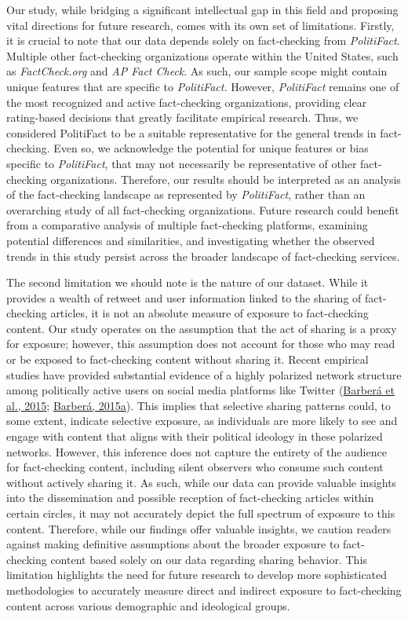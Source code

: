 \documentclass[
  12pt,
]{article}
\begin{document}
Our study, while bridging a significant intellectual gap in this field
and proposing vital directions for future research, comes with its own
set of limitations. Firstly, it is crucial to note that our data depends
solely on fact-checking from \emph{PolitiFact}. Multiple other
fact-checking organizations operate within the United States, such as
\emph{FactCheck.org} and \emph{AP Fact Check}. As such, our sample scope
might contain unique features that are specific to \emph{PolitiFact.}
However, \emph{PolitiFact} remains one of the most recognized and active
fact-checking organizations, providing clear rating-based decisions that
greatly facilitate empirical research. Thus, we considered PolitiFact to
be a suitable representative for the general trends in fact-checking.
Even so, we acknowledge the potential for unique features or bias
specific to \emph{PolitiFact}, that may not necessarily be
representative of other fact-checking organizations. Therefore, our
results should be interpreted as an analysis of the fact-checking
landscape as represented by \emph{PolitiFact}, rather than an
overarching study of all fact-checking organizations. Future research
could benefit from a comparative analysis of multiple fact-checking
platforms, examining potential differences and similarities, and
investigating whether the observed trends in this study persist across
the broader landscape of fact-checking services.

The second limitation we should note is the nature of our dataset. While
it provides a wealth of retweet and user information linked to the
sharing of fact-checking articles, it is not an absolute measure of
exposure to fact-checking content. Our study operates on the assumption
that the act of sharing is a proxy for exposure; however, this
assumption does not account for those who may read or be exposed to
fact-checking content without sharing it. Recent empirical studies have
provided substantial evidence of a highly polarized network structure
among politically active users on social media platforms like Twitter
(\protect\hyperlink{ref-barbera2015tweeting}{Barberá et al., 2015};
\protect\hyperlink{ref-barbera2015birds}{Barberá, 2015a}). This implies
that selective sharing patterns could, to some extent, indicate
selective exposure, as individuals are more likely to see and engage
with content that aligns with their political ideology in these
polarized networks. However, this inference does not capture the
entirety of the audience for fact-checking content, including silent
observers who consume such content without actively sharing it. As such,
while our data can provide valuable insights into the dissemination and
possible reception of fact-checking articles within certain circles, it
may not accurately depict the full spectrum of exposure to this content.
Therefore, while our findings offer valuable insights, we caution
readers against making definitive assumptions about the broader exposure
to fact-checking content based solely on our data regarding sharing
behavior. This limitation highlights the need for future research to
develop more sophisticated methodologies to accurately measure direct
and indirect exposure to fact-checking content across various
demographic and ideological groups.
\end{document}
